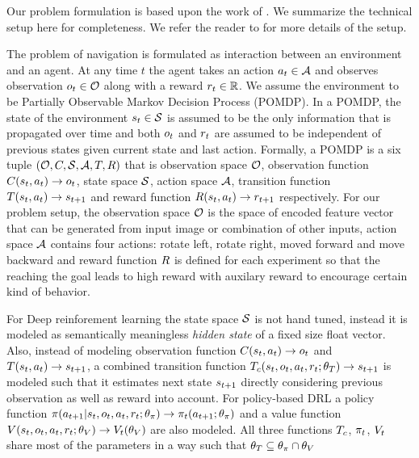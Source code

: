 Our problem formulation is based upon the work of \cite{MiPaViICLR2017}. We summarize the technical setup here for completeness.
We refer the reader to \cite{MnBaMiICML2016,MiPaViICLR2017} for more details of the setup.

The problem of navigation is formulated as interaction between an environment and an agent.
At any time $t$ the agent takes an action $a_t \in \mathcal{A}$ and observes observation $o_t \in \mathcal{O}$ along with a reward $r_t \in \mathbb{R}$.
We assume the environment to be Partially Observable Markov Decision Process (POMDP).
In a POMDP, the state of the environment $s_t \in \mathcal{S}$
is assumed to be the only information that is propagated over time and both
$o_t$ and $r_t$ are assumed to be independent of previous states given current state and last action.
Formally, a POMDP is a six tuple $(\mathcal{O}, C, \mathcal{S}, \mathcal{A}, T, R)$ that is observation space $\mathcal{O}$, observation function $C(s_t, a_t) \rightarrow o_t$, state space $\mathcal{S}$, action space $\mathcal{A}$, transition function $T(s_t, a_t) \rightarrow s_{t+1}$ and reward function $R(s_t, a_t) \rightarrow r_{t+1}$ respectively.
For our problem setup, the observation space $\mathcal{O}$ is the space of encoded feature vector that can be generated from input image or combination of other inputs, action space $\mathcal{A}$ contains four actions: rotate left, rotate right, moved forward and move backward and reward function $R$ is defined for each experiment so that the reaching the goal leads to high reward with auxilary reward to encourage certain kind of behavior.

For Deep reinforement learning the state space $\mathcal{S}$ is not hand tuned, instead it is modeled as semantically meaningless \emph{hidden state} of a fixed size float vector.
Also, instead of modeling observation function $C(s_t, a_t) \rightarrow o_t$ and $T(s_t, a_t) \rightarrow s_{t+1}$, a combined transition function $T_c(s_t, o_t, a_t, r_t; \theta_T) \rightarrow s_{t+1}$ is modeled such that it estimates next state $s_{t+1}$ directly considering previous observation as well as reward into account. For policy-based DRL a policy function $\pi(a_{t+1}|s_t, o_t, a_t, r_t; \theta_\pi) \rightarrow \pi_t(a_{t+1} ; \theta_\pi)$ and a value function $V(s_t, o_t, a_t, r_t; \theta_V) \rightarrow V_t(\theta_V)$ are also modeled. All three functions $T_c$, $\pi_t$, $V_t$ share most of the parameters in a way such that $\theta_T \subseteq \theta_{\pi} \cap \theta_V$

